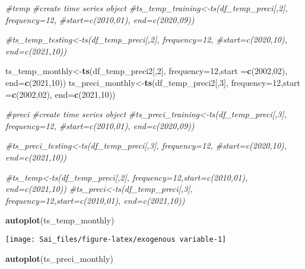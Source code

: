 \documentclass[
]{article}
\newenvironment{Shaded}{\begin{snugshade}}{\end{snugshade}}
\newcommand{\AttributeTok}[1]{\textcolor[rgb]{0.13,0.29,0.53}{#1}}
\newcommand{\CommentTok}[1]{\textcolor[rgb]{0.56,0.35,0.01}{\textit{#1}}}
\newcommand{\DecValTok}[1]{\textcolor[rgb]{0.00,0.00,0.81}{#1}}
\newcommand{\FunctionTok}[1]{\textcolor[rgb]{0.13,0.29,0.53}{\textbf{#1}}}
\newcommand{\NormalTok}[1]{#1}
\newcommand{\OtherTok}[1]{\textcolor[rgb]{0.56,0.35,0.01}{#1}}
\begin{document}
\begin{Shaded}
\begin{Highlighting}[]
\CommentTok{\#temp}
\CommentTok{\#create time series object }
\CommentTok{\#ts\_temp\_training\textless{}{-}ts(df\_temp\_preci[,2], frequency=12,}
                     \CommentTok{\#start=c(2010,01), end=c(2020,09))}

\CommentTok{\#ts\_temp\_testing\textless{}{-}ts(df\_temp\_preci[,2], frequency=12,}
                     \CommentTok{\#start=c(2020,10), end=c(2021,10))}

\NormalTok{ts\_temp\_monthly}\OtherTok{\textless{}{-}}\FunctionTok{ts}\NormalTok{(df\_temp\_preci2[,}\DecValTok{2}\NormalTok{], }\AttributeTok{frequency=}\DecValTok{12}\NormalTok{,}\AttributeTok{start =}\FunctionTok{c}\NormalTok{(}\DecValTok{2002}\NormalTok{,}\DecValTok{02}\NormalTok{), }\AttributeTok{end=}\FunctionTok{c}\NormalTok{(}\DecValTok{2021}\NormalTok{,}\DecValTok{10}\NormalTok{))}
\NormalTok{ts\_preci\_monthly}\OtherTok{\textless{}{-}}\FunctionTok{ts}\NormalTok{(df\_temp\_preci2[,}\DecValTok{3}\NormalTok{], }\AttributeTok{frequency=}\DecValTok{12}\NormalTok{,}\AttributeTok{start =}\FunctionTok{c}\NormalTok{(}\DecValTok{2002}\NormalTok{,}\DecValTok{02}\NormalTok{), }\AttributeTok{end=}\FunctionTok{c}\NormalTok{(}\DecValTok{2021}\NormalTok{,}\DecValTok{10}\NormalTok{))}

\CommentTok{\#preci}
\CommentTok{\#create time series object }
\CommentTok{\#ts\_preci\_training\textless{}{-}ts(df\_temp\_preci[,3], frequency=12,}
                      \CommentTok{\#start=c(2010,01), end=c(2020,09))}

\CommentTok{\#ts\_preci\_testing\textless{}{-}ts(df\_temp\_preci[,3], frequency=12,}
                     \CommentTok{\#start=c(2020,10), end=c(2021,10))}

\CommentTok{\#ts\_temp\textless{}{-}ts(df\_temp\_preci[,2], frequency=12,start=c(2010,01), end=c(2021,10))}
\CommentTok{\#ts\_preci\textless{}{-}ts(df\_temp\_preci[,3], frequency=12,start=c(2010,01), end=c(2021,10))}

\FunctionTok{autoplot}\NormalTok{(ts\_temp\_monthly)}
\end{Highlighting}
\end{Shaded}

\begin{center}\texttt{[image: Sai\_files/figure-latex/exogenous variable-1]} \end{center}

\begin{Shaded}
\begin{Highlighting}[]
\FunctionTok{autoplot}\NormalTok{(ts\_preci\_monthly)}
\end{Highlighting}
\end{Shaded}
\end{document}

